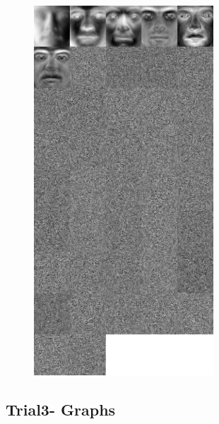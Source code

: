 \documentclass[11pt]{scrartcl} %
\theoremstyle{plain}
\begin{document}
\begin{figure}[H]
\centering
\includegraphics[width=0.6\textwidth]{figures/trial2rpca0dot001eigenfaces.jpg}
\end{figure}

\subsection{Trial3- Graphs}
\end{document}
